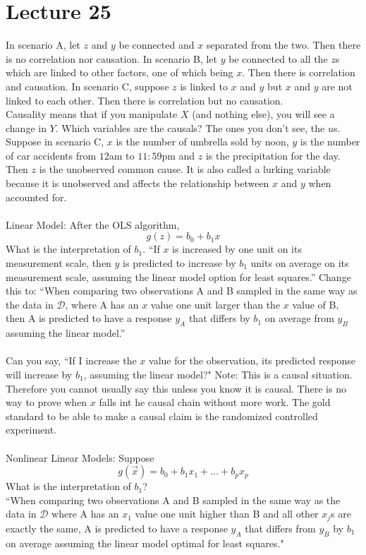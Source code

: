 \documentclass[12pt]{article}
\begin{document}
\section{Lecture 25} 
In scenario A, let $z$ and $y$ be connected and $x$ separated from the two. Then there is no correlation nor causation. In scenario B, let $y$ be connected to all the $z$s which are linked to other factors, one of which being $x$. Then there is correlation and causation. In scenario C, suppose $z$ is linked to $x$ and $y$ but $x$ and $y$ are not linked to each other. Then there is correlation but no causation. \\
Causality means that if you manipulate $X$ (and nothing else), you will see a change in $Y$. Which variables are the causals? The ones you don't see, the $u$s. Suppose in scenario C, $x$ is the number of umbrella sold by noon, $y$ is the number of car accidents from $12$am to $11:59$pm and $z$ is the precipitation for the day. Then $z$ is the unobserved common cause. It is also called a lurking variable because it is unobserved and affects the relationship between $x$ and $y$ when accounted for. \\~\\
Linear Model: After the OLS algorithm, $$ g(z) = b_0 + b_1x$$ What is the interpretation of $b_1$. ``If $x$ is increased by one unit on its measurement scale, then $y$ is predicted to increase by $b_1$  units on average on its measurement scale, assuming the linear model option for least squares.'' Change this to: ``When comparing two observations A and B sampled in the same way as the data in $\mathcal{D}$, where A has an $x$ value one unit larger than the $x$ value of B, then A is predicted to have a response $y_A$ that differs by $b_1$ on average from $y_B$ assuming the linear model.'' \\~\\
Can you say, ``If I increase the $x$ value for the observation, its predicted response will increase by $b_1$, assuming the linear model?" Note: This is a causal situation. Therefore you cannot usually say this unless you know it is causal. There is no way to prove when $x$ falls int he causal chain without more work. The gold standard to be able to make a causal claim is the randomized controlled experiment. \\~\\
Nonlinear Linear Models: Suppose $$g(\vec{x}) = b_0 + b_1x_1 + \dots + b_px_p $$ 
What is the interpretation of $b_1$? \\
``When comparing two observations A and B sampled in the same way as the data in $\mathcal{D}$ where A has an $x_1$ value one unit higher than B and all other $x_j$s are exactly the same, A is predicted to have a response $y_A$ that differs from $y_B$ by $b_1$ on average assuming the linear model optimal for least squares." \\~\\
\end{document}
